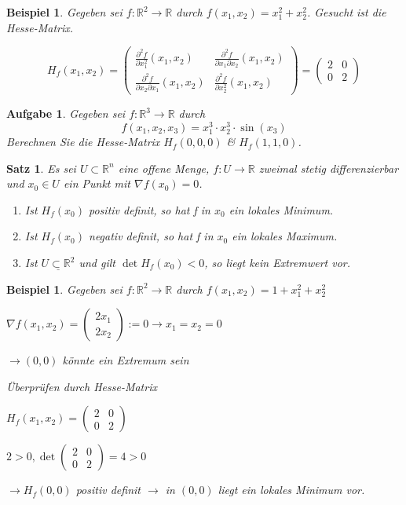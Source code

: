 \documentclass[12pt,a4paper]{scrreprt}
\newtheorem{beispiel}[defi]{Beispiel}
\newtheorem{satz}[defi]{Satz}
\newtheorem{aufg}[defi]{Aufgabe}
\begin{document}
\begin{beispiel}
	Gegeben sei $f:\mathbb{R}^2\to\mathbb{R}$ durch $f(x_1,x_2)=x_1^2+x_2^2$. Gesucht ist die Hesse-Matrix.
	
	\[H_f(x_1,x_2)=\begin{pmatrix}
	\frac{\partial^2 f}{\partial x_1^2}(x_1,x_2)  & \frac{\partial^2 f}{\partial x_1 \partial x_2}(x_1,x_2) \\
	\frac{\partial^2 f}{\partial x_2 \partial x_1}(x_1,x_2) & \frac{\partial^2 f}{\partial x_2^2}(x_1,x_2)
	\end{pmatrix}=\begin{pmatrix}
	2 & 0 \\ 0 & 2
	\end{pmatrix}\]
\end{beispiel}

\begin{aufg}
	Gegeben sei $f:\mathbb{R}^3\to\mathbb{R}$ durch
	\[f(x_1,x_2,x_3)=x_1^3 \cdot x_2^3 \cdot \sin(x_3)\]
	Berechnen Sie die Hesse-Matrix $H_f(0,0,0)$ \& $H_f(1,1,0)$.
\end{aufg}

\begin{satz}
	Es sei $U\subset\mathbb{R}^n$ eine offene Menge, $f:U\to\mathbb{R}$ zweimal stetig differenzierbar und $x_0\in U$ ein Punkt mit $\nabla f(x_0)=0$.
	\begin{enumerate}[label=(\roman*)]
		\item Ist $H_f(x_0)$ positiv definit, so hat f in $x_0$ ein lokales Minimum.
		\item Ist $H_f(x_0)$ negativ definit, so hat f in $x_0$ ein lokales Maximum.
		\item Ist $\underline{U\subset\mathbb{R}^2}$ und gilt $\det H_f(x_0) < 0$, so liegt kein Extremwert vor.
	\end{enumerate}
\end{satz}

\begin{beispiel}
	Gegeben sei $f:\mathbb{R}^2\to\mathbb{R}$ durch $f(x_1,x_2)=1+x_1^2+x_2^2$
	
	$\nabla f(x_1,x_2)=\begin{pmatrix}
	2x_1 \\ 2x_2
	\end{pmatrix} := 0 \to x_1=x_2=0$
	
	$\to (0,0)$ könnte ein Extremum sein
	
	Überprüfen durch Hesse-Matrix
	
	$H_f(x_1,x_2)=\begin{pmatrix}
	2 & 0 \\ 0 & 2
	\end{pmatrix}$
	
	$2>0, \det\begin{pmatrix}
	2 & 0 \\ 0 & 2
	\end{pmatrix}=4>0$
	
	$\to H_f(0,0)$ positiv definit $\to$ in $(0,0)$ liegt ein lokales Minimum vor.
\end{beispiel}
\end{document}
